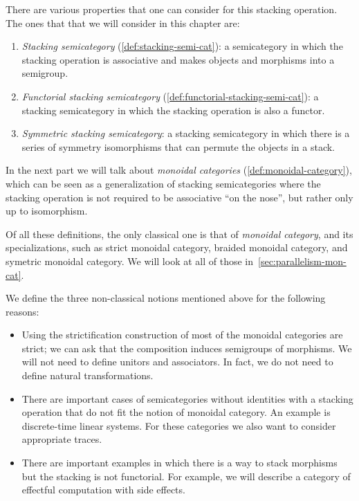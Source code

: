 There are various properties that one can consider for this stacking operation.
The ones that that we will consider in this chapter are:
%
\begin{enumerate}
    \item \emph{Stacking semicategory} (\cref{def:stacking-semi-cat}): a semicategory in which the stacking operation is associative and makes objects and morphisms into a semigroup.
    \item \emph{Functorial stacking semicategory} (\cref{def:functorial-stacking-semi-cat}): a stacking semicategory in which the stacking operation is also a functor.
    \item \emph{Symmetric stacking semicategory}: a stacking semicategory in which there is a series of symmetry isomorphisms that can permute the objects in a stack.
\end{enumerate}
%
In the next part we will talk about \emph{monoidal categories} (\cref{def:monoidal-category}), which can be seen as a generalization of stacking semicategories where the stacking operation is not required to be associative ``on the nose'', but rather only up to isomorphism.

\begin{remark}
    Of all these definitions, the only classical one is that of \emph{monoidal category}, and its specializations, such as strict monoidal category, braided monoidal category, and symetric monoidal category.
    We will look at all of those in~\cref{sec:parallelism-mon-cat}.

    We define the three non-classical notions mentioned above for the following reasons:
    \begin{itemize}
        \item Using the strictification construction of \SetL most of the monoidal categories are strict; we can ask that the composition induces semigroups of morphisms.
              We will not need to define unitors and associators.
              In fact, we do not need to define natural transformations.
        \item There are important cases of semicategories without identities with a stacking operation that do not fit the notion of monoidal category.
              An example is discrete-time linear systems.
              For these categories we also want to consider appropriate traces.
        \item There are important examples in which there is a way to stack morphisms but the stacking is not functorial.
              For example, we will describe a category of effectful computation with side effects.
    \end{itemize}
\end{remark}

